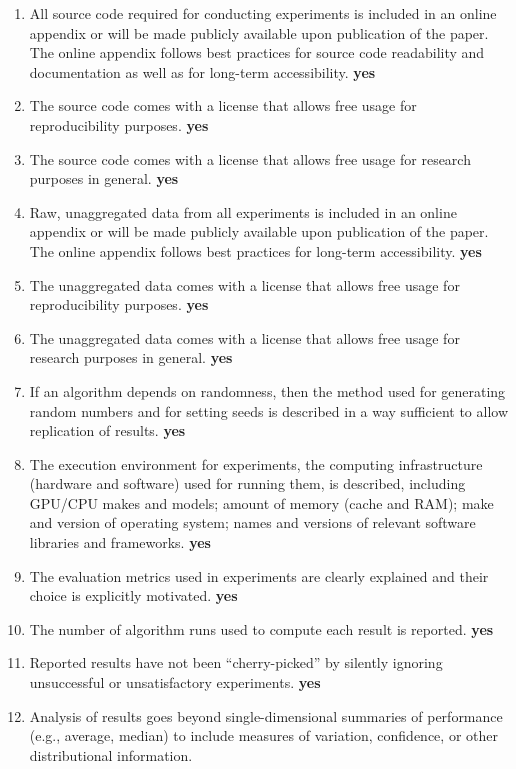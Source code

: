 \documentclass[manuscript, screen, review]{jair}
\begin{document}
\begin{enumerate}
    \item
    All source code required for conducting experiments is included in an online appendix
    or will be made publicly available upon publication of the paper.
    The online appendix follows best practices for source code readability and documentation as well as for long-term accessibility.
    \textbf{yes}
    \item The source code comes with a license that
    allows free usage for reproducibility purposes.
    \textbf{yes}
    \item The source code comes with a license that
    allows free usage for research purposes in general.
    \textbf{yes}
    \item
    Raw, unaggregated data from all experiments is included in an online appendix
    or will be made publicly available upon publication of the paper.
    The online appendix follows best practices for long-term accessibility.
    \textbf{yes}
    \item The unaggregated data comes with a license that
    allows free usage for reproducibility purposes.
    \textbf{yes}
    \item The unaggregated data comes with a license that
    allows free usage for research purposes in general.
    \textbf{yes}
    \item If an algorithm depends on randomness, then the method used for generating random numbers and for setting seeds is described in a way sufficient to allow replication of results.
    \textbf{yes}
    \item The execution environment for experiments, the computing infrastructure (hardware and software) used for running them, is described, including GPU/CPU makes and models; amount of memory (cache and RAM); make and version of operating system; names and versions of relevant software libraries and frameworks.
    \textbf{yes}
    \item
    The evaluation metrics used in experiments are clearly explained and their choice is explicitly motivated.
    \textbf{yes}
    \item
    The number of algorithm runs used to compute each result is reported.
    \textbf{yes}
    \item
    Reported results have not been ``cherry-picked'' by silently ignoring unsuccessful or unsatisfactory experiments.
    \textbf{yes}
    \item
    Analysis of results goes beyond single-dimensional summaries of performance (e.g., average, median) to include measures of variation, confidence, or other distributional information.

\end{enumerate}
\end{document}
